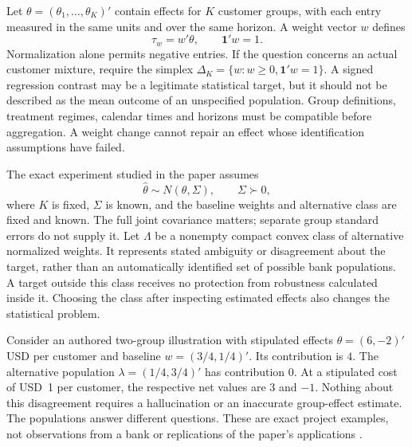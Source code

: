 Let $\theta=(\theta_1,\ldots,\theta_K)'$ contain effects for $K$ customer groups,
with each entry measured in the same units and over the same horizon. A weight
vector $w$ defines
\begin{equation}
 \tau_w=w'\theta,\qquad \mathbf{1}'w=1.
 \label{exec22:targets-definition}
\end{equation}
Normalization alone permits negative entries. If the question concerns an
actual customer mixture, require the simplex
$\Delta_K=\{w:w\geq0,\mathbf{1}'w=1\}$. A signed regression contrast may be a
legitimate statistical target, but it should not be described as the mean
outcome of an unspecified population. Group definitions, treatment regimes,
calendar times and horizons must be compatible before aggregation. A weight
change cannot repair an effect whose identification assumptions have failed.

The exact experiment studied in the paper assumes
\begin{equation}
 \widehat\theta\sim N(\theta,\Sigma),\qquad \Sigma\succ0,
 \label{exec22:targets-experiment}
\end{equation}
where $K$ is fixed, $\Sigma$ is known, and the baseline weights and alternative
class are fixed and known. The full joint covariance matters; separate group
standard errors do not supply it. Let $\Lambda$ be a nonempty compact convex
class of alternative normalized weights. It represents stated ambiguity or
disagreement about the target, rather than an automatically identified set of
possible bank populations. A target outside this class receives no protection
from robustness calculated inside it. Choosing the class after inspecting
estimated effects also changes the statistical problem.

Consider an authored two-group illustration with stipulated effects
$\theta=(6,-2)'$ USD per customer and baseline
$w=(3/4,1/4)'$. Its contribution is $4$. The alternative population
$\lambda=(1/4,3/4)'$ has contribution $0$. At a stipulated cost of USD~1 per
customer, the respective net values are $3$ and $-1$. Nothing about this
disagreement requires a hallucination or an inaccurate group-effect estimate.
The populations answer different questions. These are exact project examples,
not observations from a bank or replications of the paper's applications
\cite{exec22_weighted_reference}.

